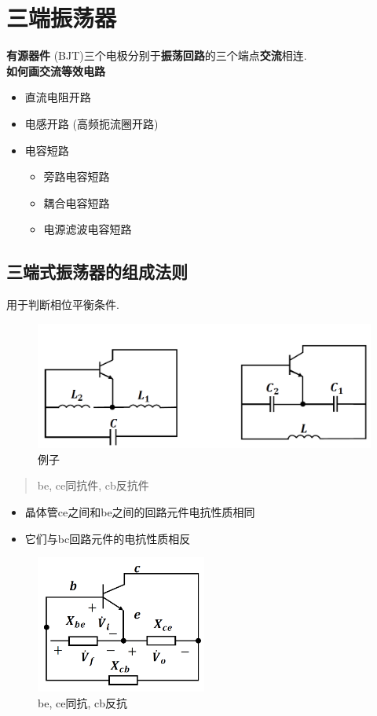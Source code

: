 \documentclass[a4paper]{report}
\begin{document}
\section{三端振荡器}
\textbf{有源器件} (BJT)三个电极分别于\textbf{振荡回路}的三个端点\textbf{交流}相连. \\
\textbf{如何画交流等效电路}
\begin{itemize}
  \item 直流电阻开路
  \item 电感开路 (高频扼流圈开路)
  \item 电容短路
  \begin{itemize}
    \item 旁路电容短路
    \item 耦合电容短路
    \item 电源滤波电容短路
  \end{itemize}
\end{itemize}
\subsection{三端式振荡器的组成法则}
用于判断相位平衡条件. 
\begin{figure}[H]
  \centering
  \includegraphics[width=1\textwidth]{osc_X_rule_2.png}
  \caption{例子}
  \end{figure}
\begin{quotation}
  be, ce同抗件, cb反抗件
\end{quotation}
\begin{itemize}
  \item 晶体管ce之间和be之间的回路元件电抗性质相同
  \item 它们与bc回路元件的电抗性质相反
\end{itemize}
\begin{figure}[H]
\centering
\includegraphics[width=0.5\textwidth]{osc_X_rule_1.png}
\caption{be, ce同抗, cb反抗}
\end{figure}
\end{document}

